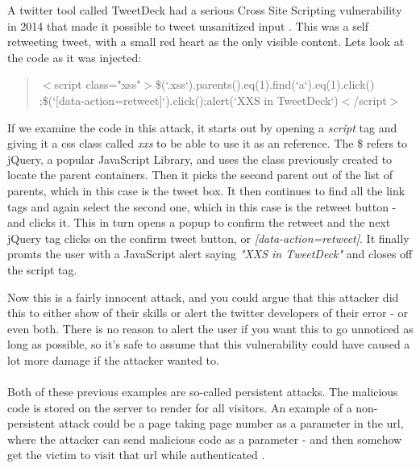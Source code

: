A twitter tool called TweetDeck had a serious Cross Site Scripting vulnerability in 2014 that made it possible to tweet unsanitized input \cite{TweetDeck}. This was a self retweeting tweet, with a small red heart as the only visible content. Lets look at the code as it was injected:
\begin{quote}
\selectfont
{$<$script class="xss"$>$\$(`.xss`).parents().eq(1).find(`a`).eq(1).click() \\ ;\$(`[data-action=retweet]`).click();alert(`XXS in TweetDeck`)$<$/script$>$}
\end{quote}
If we examine the code in this attack, it starts out by opening a \textit{script} tag and giving it a css class called \textit{xxs} to be able to use it as an reference. The \$ refers to jQuery, a popular JavaScript Library, and uses the class previously created to locate the parent containers. Then it picks the second parent out of the list of parents, which in this case is the tweet box. It then continues to find all the link tags and again select the second one, which in this case is the retweet button - and clicks it. This in turn opens a popup to confirm the retweet and the next jQuery tag clicks on the confirm tweet button, or \textit{[data-action=retweet]}. It finally promts the user with a JavaScript alert saying \textit{"XXS in TweetDeck"} and closes off the script tag.

Now this is a fairly innocent attack, and you could argue that this attacker did this to either show of their skills or alert the twitter developers of their error - or even both. There is no reason to alert the user if you want this to go unnoticed as long as possible, so it's safe to assume that this vulnerability could have caused a lot more damage if the attacker wanted to.
\\ \\
Both of these previous examples are so-called persistent attacks. The malicious code is stored on the server to render for all visitors. An example of a non-persistent attack could be a page taking page number as a parameter in the url, where the attacker can send malicious code as a parameter - and then somehow get the victim to visit that url while authenticated \cite{Edmunds2016}.
